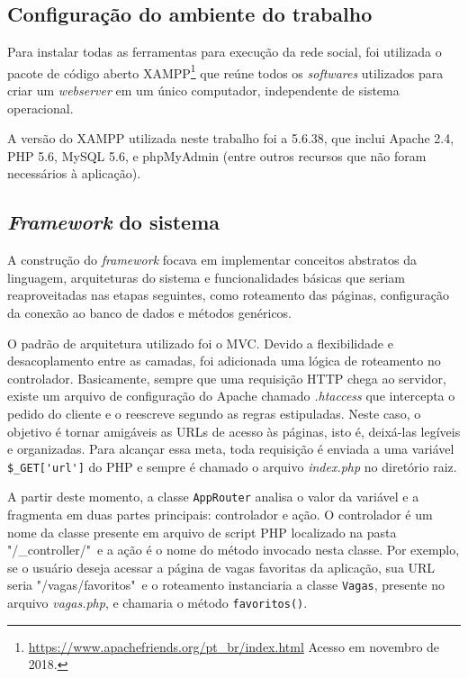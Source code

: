 \subsection{Configuração do ambiente do trabalho}
\label{implementacaoConfig}

Para instalar todas as ferramentas para execução da rede social, foi utilizada o pacote de código aberto XAMPP\footnote{\url{https://www.apachefriends.org/pt_br/index.html} Acesso em novembro de 2018.} que reúne todos os \textit{softwares} utilizados para criar um \textit{webserver} em um único computador, independente de sistema operacional.

A versão do XAMPP utilizada neste trabalho foi a 5.6.38, que inclui  Apache 2.4, PHP 5.6, MySQL 5.6,  e phpMyAdmin (entre outros recursos que não foram necessários à aplicação).

\subsection{\textit{Framework} do sistema}
\label{implementacaoFramework}

A construção do \textit{framework} focava em implementar conceitos abstratos da linguagem, arquiteturas do sistema e funcionalidades básicas que seriam reaproveitadas nas etapas seguintes, como roteamento das páginas, configuração da conexão ao banco de dados e métodos genéricos.

O padrão de arquitetura utilizado foi o MVC. Devido a flexibilidade e desacoplamento entre as camadas, foi adicionada uma lógica de roteamento no controlador. Basicamente, sempre que uma requisição HTTP chega ao servidor, existe um arquivo de configuração do Apache chamado \textit{.htaccess} que intercepta o pedido do cliente e o reescreve segundo as regras estipuladas. Neste caso, o objetivo é tornar amigáveis as URLs de acesso às páginas, isto é, deixá-las legíveis e organizadas. Para alcançar essa meta, toda requisição é enviada a uma variável \verb|$_GET['url']| do PHP e sempre é chamado o arquivo \textit{index.php} no diretório raiz.

A partir deste momento, a classe \verb|AppRouter| analisa o valor da variável e a fragmenta em duas partes principais: controlador e ação. O controlador é um nome da classe presente em arquivo de script PHP localizado na pasta "/\_controller/"\ e a ação é o nome do método invocado nesta classe. Por exemplo, se o usuário deseja acessar a página de vagas favoritas da aplicação, sua URL seria "/vagas/favoritos"\ e o roteamento instanciaria a classe \verb|Vagas|, presente no arquivo \textit{vagas.php}, e chamaria o método \verb|favoritos()|. 

